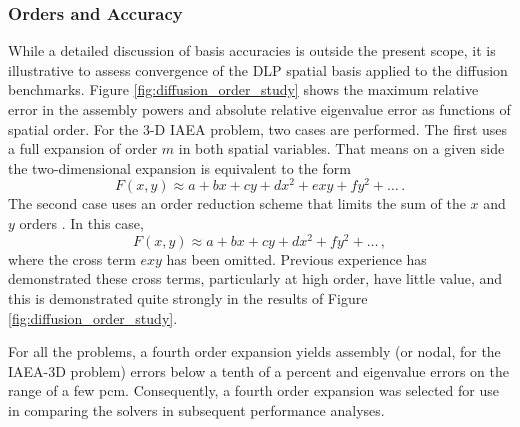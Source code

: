 \subsubsection{Orders and Accuracy}
\label{sec:diffusion_order_accuracy}

While a detailed discussion of basis accuracies is outside the 
present scope, it is illustrative to assess convergence 
of the DLP spatial basis applied to the diffusion benchmarks.  
Figure \ref{fig:diffusion_order_study}
 shows the maximum relative error in the assembly 
powers and absolute relative eigenvalue error as functions of spatial order.
For the 
3-D IAEA problem, two cases are performed.  The first uses a full 
expansion of order $m$ in both spatial variables.  That means on a given 
side the two-dimensional expansion is equivalent to the form 
\begin{equation}
 F(x, y) \approx a + bx + cy + d x^2 + e xy + f y^2 + \ldots \, .
\end{equation}
The second case uses an order reduction scheme that 
limits the sum of the $x$ and $y$ orders \cite{forget2006tdh}.  In this case,
\begin{equation}
 F(x, y) \approx a + bx + cy + d x^2 + f y^2 + \ldots \, ,
\end{equation}
where the cross term $e xy$ has been omitted.  Previous experience 
has demonstrated these cross terms, particularly at high order, have 
little value, and this is demonstrated quite strongly in the results
of Figure \ref{fig:diffusion_order_study}.


For all the problems, a fourth order expansion yields assembly 
(or nodal, for the IAEA-3D problem) errors below a tenth of a percent 
and eigenvalue errors on the range of a few pcm.  Consequently, a fourth 
order expansion was selected for use in comparing the solvers in 
subsequent performance analyses.


